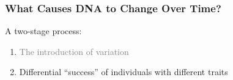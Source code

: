 \documentclass[10pt]{beamer}
\begin{document}
\begin{frame}[t]
\frametitle{What Causes DNA to Change Over Time?}
\vspace{0.5cm}

	A two-stage process:
	\smallskip
	
		\begin{enumerate}
			\item \textcolor{gray}{The introduction of variation}
			\smallskip
			\item Differential ``success'' of individuals with different traits
		\end{enumerate}
\end{frame}		


\end{document}
